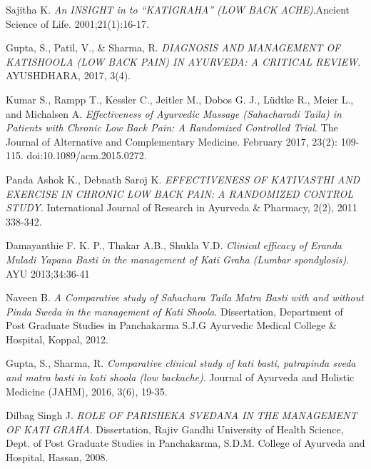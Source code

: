 \begin{thebibliography}{3}

 Sajitha K. \textit{An INSIGHT in to “KATIGRAHA” (LOW BACK ACHE)}.Ancient Science of Life. 2001;21(1):16-17.


 Gupta, S., Patil, V., \& Sharma, R. \textit{DIAGNOSIS AND MANAGEMENT OF KATISHOOLA (LOW BACK PAIN) IN AYURVEDA: A CRITICAL REVIEW}. AYUSHDHARA, 2017, 3(4).


 Kumar S., Rampp T., Kessler C., Jeitler M., Dobos G. J., Lüdtke R., Meier L., and Michalsen A. \textit{Effectiveness of Ayurvedic Massage (Sahacharadi Taila) in Patients with Chronic Low Back Pain: A Randomized Controlled Trial}. The Journal of Alternative and Complementary Medicine. February 2017, 23(2): 109-115. doi:10.1089/acm.2015.0272.


 Panda Ashok K., Debnath Saroj K. \textit{EFFECTIVENESS OF KATIVASTHI AND EXERCISE IN CHRONIC LOW BACK PAIN: A RANDOMIZED CONTROL STUDY}. International Journal of Research in Ayurveda \& Pharmacy, 2(2), 2011  338-342.

 Damayanthie F. K. P., Thakar A.B., Shukla V.D. \textit{Clinical efficacy of Eranda Muladi Yapana Basti in the management of Kati Graha (Lumbar spondylosis)}. AYU 2013;34:36-41


 Naveen B. \textit{A Comparative study of Sahachara Taila Matra Basti with and without Pinda Sweda in the management of Kati Shoola}. Dissertation, Department of Post Graduate Studies in Panchakarma S.J.G Ayurvedic Medical College \& Hospital, Koppal, 2012.


 Gupta, S., Sharma, R. \textit{Comparative clinical study of kati basti, patrapinda sveda and matra basti in kati shoola (low backache)}. Journal of Ayurveda and Holistic Medicine (JAHM), 2016, 3(6), 19-35.


 Dilbag Singh J. \textit{ROLE OF PARISHEKA SVEDANA IN THE MANAGEMENT OF KATI GRAHA}. Dissertation, Rajiv Gandhi University of Health Science, Dept. of Post Graduate Studies in Panchakarma, S.D.M. College of Ayurveda and Hospital, Hassan, 2008.



\end{thebibliography}
